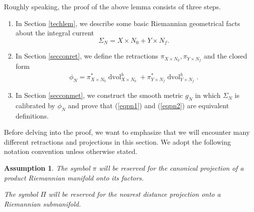 \documentclass[11pt,a4paper]{amsart}
\numberwithin{equation}{section}
\newcommand{\Si}{\Sigma}
\newcommand{\dvol}{\operatorname{dvol}}
\newcommand{\du}{^\ast}
\theoremstyle{plain}
\newtheorem{assump}[exam]{Assumption}
\theoremstyle{definition}
\numberwithin{equation}{subsection}
\begin{document}
 Roughly speaking, the proof of the above lemma consists of three steps.
\begin{enumerate}
\item In Section \ref{techlem}, we describe some basic Riemannian geometrical facts about the integral current  $$\Si_N=X\times N_0
+Y\times N_f.$$  
\item In Section \ref{secconret}, we define the retractions $\pi_{X\times N_0},\pi_{Y\times N_f}$ and the closed form \begin{align}
\phi_N=\pi_{X\times N_0}\du \dvol_{X\times N_0}^h+\pi_{Y\times N_f}\du \dvol_{Y\times N_f}^h.
\label{eqpn2}\end{align}
\item In Section \ref{secconmet}, we construct the smooth metric $g_N$ in which $\Si_N$ is calibrated by $\phi_N$ and prove that (\ref{eqpn1}) and (\ref{eqpn2}) are equivalent definitions.
\end{enumerate}
Before delving into the proof, we want to emphasize that we will encounter many different retractions and projections in this section. We adopt the following notation convention unless otherwise stated.
\begin{assump}
	The symbol $\pi$ will be reserved for the canonical projection of a product Riemannian manifold onto its factors. 
	
	The symbol $\Pi$ will be reserved for the nearest distance projection onto a Riemannian submanifold.
\end{assump}
\end{document}
